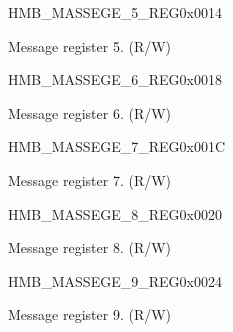 \begin{register}{H}{MB\_MASSEGE\_5\_REG}{0x0014}\label{regdesc:MBMESSAGE5REG}
%
\regnewline%
\begin{regdesc}\begin{reglist}
\label{fielddesc:MBMESSAGE5}\item [MB\_MASSEGE\_5] Message register 5. (R/W)
\end{reglist}\end{regdesc}
\end{register}


\begin{register}{H}{MB\_MASSEGE\_6\_REG}{0x0018}\label{regdesc:MBMESSAGE6REG}
%
\regnewline%
\begin{regdesc}\begin{reglist}
\label{fielddesc:MBMESSAGE6}\item [MB\_MASSEGE\_6] Message register 6. (R/W)
\end{reglist}\end{regdesc}
\end{register}


\begin{register}{H}{MB\_MASSEGE\_7\_REG}{0x001C}\label{regdesc:MBMESSAGE7REG}
%
\regnewline%
\begin{regdesc}\begin{reglist}
\label{fielddesc:MBMESSAGE7}\item [MB\_MASSEGE\_7] Message register 7. (R/W)
\end{reglist}\end{regdesc}
\end{register}


\begin{register}{H}{MB\_MASSEGE\_8\_REG}{0x0020}\label{regdesc:MBMESSAGE8REG}
%
\regnewline%
\begin{regdesc}\begin{reglist}
\label{fielddesc:MBMESSAGE8}\item [MB\_MASSEGE\_8] Message register 8. (R/W)
\end{reglist}\end{regdesc}
\end{register}


\begin{register}{H}{MB\_MASSEGE\_9\_REG}{0x0024}\label{regdesc:MBMESSAGE9REG}
%
\regnewline%
\begin{regdesc}\begin{reglist}
\label{fielddesc:MBMESSAGE9}\item [MB\_MASSEGE\_9] Message register 9. (R/W)
\end{reglist}\end{regdesc}
\end{register}



